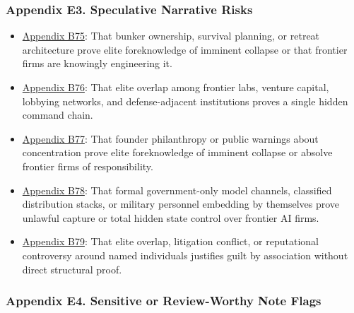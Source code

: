 \documentclass[
  american,
  11pt,
  letterpaper,
]{article}
\providecommand{\tightlist}{%
  \setlength{\itemsep}{0pt}\setlength{\parskip}{0pt}}
\begin{document}
\subsubsection{Appendix E3. Speculative Narrative
Risks}\label{ch-08-appendix-e3-speculative-narrative-risks}

\begin{itemize}
\tightlist
\item
  \hyperref[ch-08-appendix-b75-bunker-ownership-survival-planning-or-retreat-architecture-prove-elite-foreknow]{Appendix
  B75}: That bunker ownership, survival planning, or retreat
  architecture prove elite foreknowledge of imminent collapse or that
  frontier firms are knowingly engineering it.
\item
  \hyperref[ch-08-appendix-b76-elite-overlap-among-frontier-labs-venture-capital-lobbying-networks-and-defens]{Appendix
  B76}: That elite overlap among frontier labs, venture capital,
  lobbying networks, and defense-adjacent institutions proves a single
  hidden command chain.
\item
  \hyperref[ch-08-appendix-b77-founder-philanthropy-or-public-warnings-about-concentration-prove-elite-foreknowl]{Appendix
  B77}: That founder philanthropy or public warnings about concentration
  prove elite foreknowledge of imminent collapse or absolve frontier
  firms of responsibility.
\item
  \hyperref[ch-08-appendix-b78-formal-government-only-model-channels-classified-distribution-stacks-or-militar]{Appendix
  B78}: That formal government-only model channels, classified
  distribution stacks, or military personnel embedding by themselves
  prove unlawful capture or total hidden state control over frontier AI
  firms.
\item
  \hyperref[ch-08-appendix-b79-elite-overlap-litigation-conflict-or-reputational-controversy-around-named-indi]{Appendix
  B79}: That elite overlap, litigation conflict, or reputational
  controversy around named individuals justifies guilt by association
  without direct structural proof.
\end{itemize}

\subsubsection{Appendix E4. Sensitive or Review-Worthy Note
Flags}\label{ch-08-appendix-e4-sensitive-or-review-worthy-note-flags}
\end{document}
